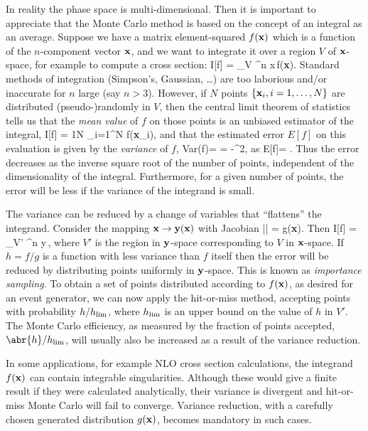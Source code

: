 \label{mcmethods:integ}   
In reality the phase space is multi-dimensional.
Then it is important to appreciate that the Monte Carlo method is based on the
concept of an integral as an average.  Suppose we have a matrix element-squared
$f({\bf x})$ which is a function of the $n$-component vector ${\bf x}$, and
we want to integrate it over a region $V$ of ${\bf x}$-space, for
example to compute a cross section:
\beq
I[f] = \int_V \done^n x\,f({\bf x})\;.
\eeq
Standard methods of integration (Simpson's, Gaussian, \ldots) are too
laborious and/or inaccurate for $n$ large (say $n>3$).  However, if
$N$ points $\{{\bf x}_i,i=1,\ldots,N\}$ are distributed (pseudo-)randomly in
$V$,  then the central limit theorem of statistics tells us that
the {\em mean value} of $f$ on those points is an unbiased estimator of the integral,
\beq
I[f]\simeq{} = \frac 1N \sum_{i=1}^N f({\bf x}_i)\;,
\eeq
and that the estimated error $E[f]$ on this evaluation is given by
the {\em variance} of $f$,
\beq
\mbox{Var}(f)= = -^2\;,
\eeq
as
\beq
E[f]= \;.
\eeq
Thus the error decreases as the inverse square root of the number of
points, independent of the dimensionality of the integral.
Furthermore, for a given number of points, the error will be less
if the variance of the integrand is small.

The variance can be reduced by a change of variables that ``flattens''
the integrand.  Consider the mapping  ${\bf x}\to {\bf y}({\bf x})$ with
Jacobian
\beq
\left|\right| = g({\bf x})\;.
\eeq
Then
\beq
I[f] =  \int_{V'} \done^n y\,\;,
\eeq
where $V'$ is the region in ${\bf y}$-space corresponding to $V$ in ${\bf x}$-space.
If $h=f/g$ is a function with less variance than $f$ itself then the error will be
reduced by distributing points uniformly in ${\bf y}$-space. This is
known as {\it importance sampling}. To obtain
a set of points distributed according to $f({\bf x})$,
as desired for an event generator, we can now apply the hit-or-miss
method, accepting points with probability $h/h_{\rm lim}$, where
$h_{\rm lim}$ is an upper bound on the value of $h$ in $V'$. The Monte
Carlo efficiency, as measured by the fraction of points accepted,
$\abr{h}/h_{\rm lim}$, will usually also be increased as a result of
the variance reduction.

 In some applications, for example NLO cross section calculations, the
 integrand $f({\bf x})$ can contain integrable singularities. Although
 these would give a finite result if they were calculated
 analytically, their variance is divergent and hit-or-miss Monte Carlo
 will fail to converge. Variance reduction, with a carefully chosen
 generated distribution $g({\bf x})$, becomes mandatory in such cases.

